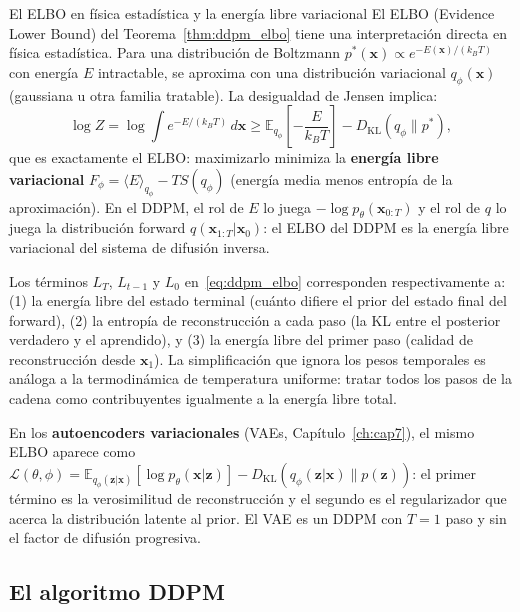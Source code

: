 \begin{fisicaconexion}{El ELBO en física estadística y la energía libre variacional}
El ELBO (Evidence Lower Bound) del Teorema~\ref{thm:ddpm_elbo} tiene una
interpretación directa en física estadística. Para una distribución de Boltzmann
$p^*(\bm{x}) \propto e^{-E(\bm{x})/(k_BT)}$ con energía $E$ intractable, se
aproxima con una distribución variacional $q_\phi(\bm{x})$ (gaussiana u otra
familia tratable). La desigualdad de Jensen implica:
\[
  \log Z = \log\int e^{-E/(k_BT)}\,d\bm{x}
  \geq \mathbb{E}_{q_\phi}\!\left[-\frac{E}{k_BT}\right] - D_\mathrm{KL}(q_\phi\|p^*),
\]
que es exactamente el ELBO: maximizarlo minimiza la \textbf{energía libre
variacional} $F_\phi = \langle E\rangle_{q_\phi} - T S(q_\phi)$ (energía media
menos entropía de la aproximación). En el DDPM, el rol de $E$ lo juega
$-\log p_\theta(\bm{x}_{0:T})$ y el rol de $q$ lo juega la distribución forward
$q(\bm{x}_{1:T}|\bm{x}_0)$: el ELBO del DDPM es la energía libre variacional
del sistema de difusión inversa.

Los términos $L_T$, $L_{t-1}$ y $L_0$ en~\eqref{eq:ddpm_elbo} corresponden
respectivamente a: (1) la energía libre del estado terminal (cuánto difiere el
prior del estado final del forward), (2) la entropía de reconstrucción a cada
paso (la KL entre el posterior verdadero y el aprendido), y (3) la energía libre
del primer paso (calidad de reconstrucción desde $\bm{x}_1$). La simplificación
que ignora los pesos temporales es análoga a la termodinámica de temperatura
uniforme: tratar todos los pasos de la cadena como contribuyentes igualmente a
la energía libre total.

En los \textbf{autoencoders variacionales} (VAEs, Capítulo~\ref{ch:cap7}), el
mismo ELBO aparece como $\mathcal{L}(\theta,\phi) = \mathbb{E}_{q_\phi(\bm{z}|\bm{x})}
[\log p_\theta(\bm{x}|\bm{z})] - D_\mathrm{KL}(q_\phi(\bm{z}|\bm{x})\|p(\bm{z}))$:
el primer término es la verosimilitud de reconstrucción y el segundo es el
regularizador que acerca la distribución latente al prior. El VAE es un DDPM
con $T=1$ paso y sin el factor de difusión progresiva.
\end{fisicaconexion}

\subsection{El algoritmo DDPM}
\label{subsec:ddpm_algoritmo}

